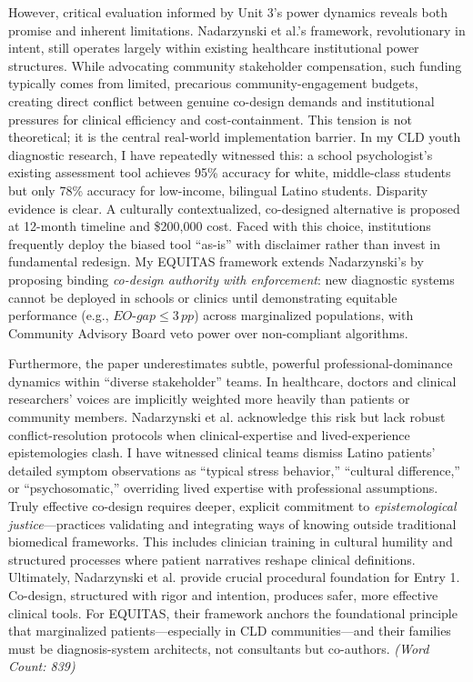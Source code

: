 \documentclass[11pt,twoside]{article}
\DeclareRobustCommand{\EOgap}{EO\text{-}gap\xspace}
\DeclareRobustCommand{\pp}{pp\xspace} %
\begin{document}
However, critical evaluation informed by Unit 3's power dynamics reveals both promise and inherent limitations. Nadarzynski et al.'s framework, revolutionary in intent, still operates largely within existing healthcare institutional power structures. While advocating community stakeholder compensation, such funding typically comes from limited, precarious community-engagement budgets, creating direct conflict between genuine co-design demands and institutional pressures for clinical efficiency and cost-containment. This tension is not theoretical; it is the central real-world implementation barrier. In my CLD youth diagnostic research, I have repeatedly witnessed this: a school psychologist's existing assessment tool achieves 95\% accuracy for white, middle-class students but only 78\% accuracy for low-income, bilingual Latino students. Disparity evidence is clear. A culturally contextualized, co-designed alternative is proposed at 12-month timeline and \$200,000 cost. Faced with this choice, institutions frequently deploy the biased tool ``as-is'' with disclaimer rather than invest in fundamental redesign. My EQUITAS framework extends Nadarzynski's by proposing binding \textit{co-design authority with enforcement}: new diagnostic systems cannot be deployed in schools or clinics until demonstrating equitable performance (e.g., $\EOgap \le 3\,\pp$) across marginalized populations, with Community Advisory Board veto power over non-compliant algorithms.

Furthermore, the paper underestimates subtle, powerful professional-dominance dynamics within ``diverse stakeholder'' teams. In healthcare, doctors and clinical researchers' voices are implicitly weighted more heavily than patients or community members. Nadarzynski et al. acknowledge this risk but lack robust conflict-resolution protocols when clinical-expertise and lived-experience epistemologies clash. I have witnessed clinical teams dismiss Latino patients' detailed symptom observations as ``typical stress behavior,'' ``cultural difference,'' or ``psychosomatic,'' overriding lived expertise with professional assumptions. Truly effective co-design requires deeper, explicit commitment to \textit{epistemological justice}---practices validating and integrating ways of knowing outside traditional biomedical frameworks. This includes clinician training in cultural humility and structured processes where patient narratives reshape clinical definitions. Ultimately, Nadarzynski et al. provide crucial procedural foundation for Entry 1. Co-design, structured with rigor and intention, produces safer, more effective clinical tools. For EQUITAS, their framework anchors the foundational principle that marginalized patients---especially in CLD communities---and their families must be diagnosis-system architects, not consultants but co-authors. \textit{(Word Count: 839)}
\end{document}
